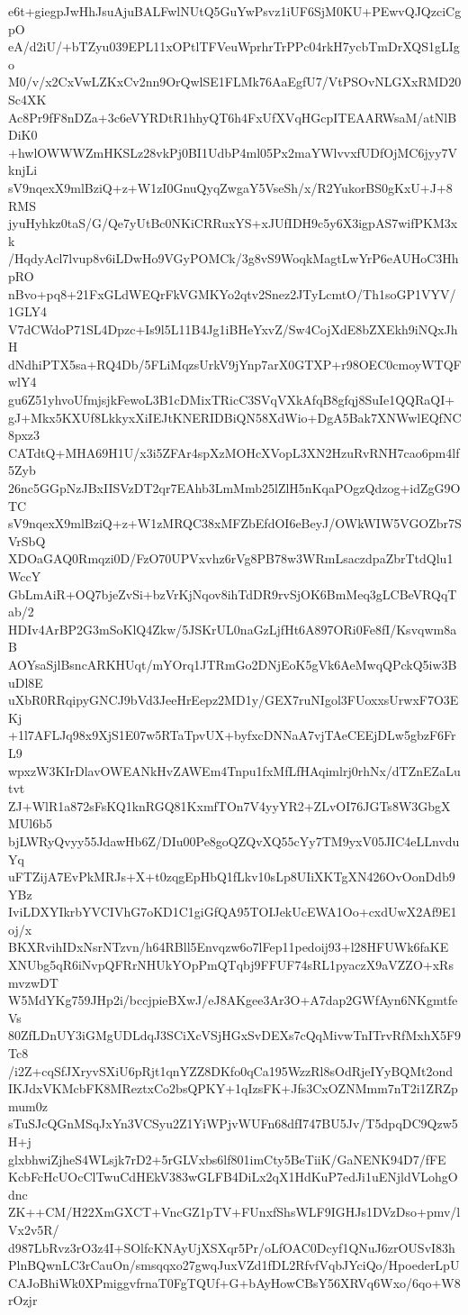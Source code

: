 e6t+giegpJwHhJsuAjuBALFwlNUtQ5GuYwPsvz1iUF6SjM0KU+PEwvQJQzciCgpO
eA/d2iU/+bTZyu039EPL11xOPtlTFVeuWprhrTrPPc04rkH7ycbTmDrXQS1gLIgo
M0/v/x2CxVwLZKxCv2nn9OrQwlSE1FLMk76AaEgfU7/VtPSOvNLGXxRMD20Sc4XK
Ac8Pr9fF8nDZa+3c6eVYRDtR1hhyQT6h4FxUfXVqHGcpITEAARWsaM/atNlBDiK0
+hwlOWWWZmHKSLz28vkPj0BI1UdbP4ml05Px2maYWlvvxfUDfOjMC6jyy7VknjLi
sV9nqexX9mlBziQ+z+W1zI0GnuQyqZwgaY5VseSh/x/R2YukorBS0gKxU+J+8RMS
jyuHyhkz0taS/G/Qe7yUtBc0NKiCRRuxYS+xJUfIDH9c5y6X3igpAS7wifPKM3xk
/HqdyAcl7lvup8v6iLDwHo9VGyPOMCk/3g8vS9WoqkMagtLwYrP6eAUHoC3HhpRO
nBvo+pq8+21FxGLdWEQrFkVGMKYo2qtv2Snez2JTyLcmtO/Th1soGP1VYV/1GLY4
V7dCWdoP71SL4Dpzc+Is9l5L11B4Jg1iBHeYxvZ/Sw4CojXdE8bZXEkh9iNQxJhH
dNdhiPTX5sa+RQ4Db/5FLiMqzsUrkV9jYnp7arX0GTXP+r98OEC0cmoyWTQFwlY4
gu6Z51yhvoUfmjsjkFewoL3B1cDMixTRicC3SVqVXkAfqB8gfqj8SuIe1QQRaQI+
gJ+Mkx5KXUf8LkkyxXiIEJtKNERIDBiQN58XdWio+DgA5Bak7XNWwlEQfNC8pxz3
CATdtQ+MHA69H1U/x3i5ZFAr4spXzMOHcXVopL3XN2HzuRvRNH7cao6pm4lf5Zyb
26nc5GGpNzJBxIISVzDT2qr7EAhb3LmMmb25lZlH5nKqaPOgzQdzog+idZgG9OTC
sV9nqexX9mlBziQ+z+W1zMRQC38xMFZbEfdOI6eBeyJ/OWkWIW5VGOZbr7SVrSbQ
XDOaGAQ0Rmqzi0D/FzO70UPVxvhz6rVg8PB78w3WRmLsaczdpaZbrTtdQlu1WccY
GbLmAiR+OQ7bjeZvSi+bzVrKjNqov8ihTdDR9rvSjOK6BmMeq3gLCBeVRQqTab/2
HDIv4ArBP2G3mSoKlQ4Zkw/5JSKrUL0naGzLjfHt6A897ORi0Fe8fI/Ksvqwm8aB
AOYsaSjlBsncARKHUqt/mYOrq1JTRmGo2DNjEoK5gVk6AeMwqQPckQ5iw3BuDl8E
uXbR0RRqipyGNCJ9bVd3JeeHrEepz2MD1y/GEX7ruNIgol3FUoxxsUrwxF7O3EKj
+1l7AFLJq98x9XjS1E07w5RTaTpvUX+byfxcDNNaA7vjTAeCEEjDLw5gbzF6FrL9
wpxzW3KIrDlavOWEANkHvZAWEm4Tnpu1fxMfLfHAqimlrj0rhNx/dTZnEZaLutvt
ZJ+WlR1a872sFsKQ1knRGQ81KxmfTOn7V4yyYR2+ZLvOI76JGTs8W3GbgXMUl6b5
bjLWRyQvyy55JdawHb6Z/DIu00Pe8goQZQvXQ55cYy7TM9yxV05JIC4eLLnvduYq
uFTZijA7EvPkMRJs+X+t0zqgEpHbQ1fLkv10sLp8UIiXKTgXN426OvOonDdb9YBz
IviLDXYIkrbYVCIVhG7oKD1C1giGfQA95TOIJekUcEWA1Oo+cxdUwX2Af9E1oj/x
BKXRvihIDxNsrNTzvn/h64RBll5Envqzw6o7lFep11pedoij93+l28HFUWk6faKE
XNUbg5qR6iNvpQFRrNHUkYOpPmQTqbj9FFUF74sRL1pyaczX9aVZZO+xRsmvzwDT
W5MdYKg759JHp2i/bccjpieBXwJ/eJ8AKgee3Ar3O+A7dap2GWfAyn6NKgmtfeVs
80ZfLDnUY3iGMgUDLdqJ3SCiXcVSjHGxSvDEXs7cQqMivwTnITrvRfMxhX5F9Tc8
/i2Z+cqSfJXryvSXiU6pRjt1qnYZZ8DKfo0qCa195WzzRl8sOdRjeIYyBQMt2ond
IKJdxVKMcbFK8MReztxCo2bsQPKY+1qIzsFK+Jfs3CxOZNMmm7nT2i1ZRZpmum0z
sTuSJcQGnMSqJxYn3VCSyu2Z1YiWPjvWUFn68dfI747BU5Jv/T5dpqDC9Qzw5H+j
glxbhwiZjheS4WLsjk7rD2+5rGLVxbs6lf801imCty5BeTiiK/GaNENK94D7/fFE
KcbFcHcUOcClTwuCdHEkV383wGLFB4DiLx2qX1HdKuP7edJi1uENjldVLohgOdnc
ZK++CM/H22XmGXCT+VncGZ1pTV+FUnxfShsWLF9IGHJs1DVzDso+pmv/lVx2v5R/
d987LbRvz3rO3z4I+SOlfcKNAyUjXSXqr5Pr/oLfOAC0Dcyf1QNuJ6zrOUSvI83h
PlnBQwnLC3rCauOn/smsqqxo27gwqJuxVZd1fDL2RfvfVqbJYciQo/HpoederLpU
CAJoBhiWk0XPmiggvfrnaT0FgTQUf+G+bAyHowCBsY56XRVq6Wxo/6qo+W8rOzjr
